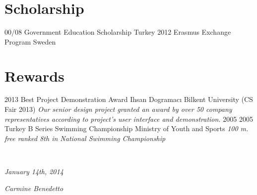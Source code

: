 \documentclass[]{friggeri-cv}
\begin{document}
\section{Scholarship}
\begin{entrylist}
  \entry
    {00/08}
    {Government Education Scholarship}
    {Turkey}
    {\emph{}}
    \entry
    {2012}
    {Erasmus Exchange Program}
    {Sweden}
    {\emph{}}
\end{entrylist}

\section{Rewards}
\begin{entrylist}
  \entry
    {2013}
    {Best Project Demonstration Award}
    {Ihsan Dogramacı Bilkent University (CS Fair 2013)}
    {\emph{Our senior design project granted an award by over 50 company representatives according to project’s user interface and demonstration.}}
    \entry
    {2005}
    {2005 Turkey B Series Swimming Championship}
    {Ministry of Youth and Sports}
    {\emph{100 m. free ranked 8th in National Swimming Championship}}
\end{entrylist}
\\
\begin{flushleft}
\emph{January 14th, 2014}
\end{flushleft}
\begin{flushright}
\emph{Carmine Benedetto}
\end{flushright}

% 
\end{document}

